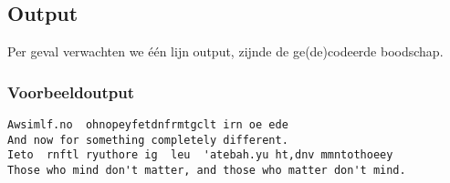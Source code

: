 \subsection*{Output}

Per geval verwachten we \'e\'en lijn output, zijnde de ge(de)codeerde boodschap.

\subsubsection*{Voorbeeldoutput}

\begin{verbatim}
Awsimlf.no  ohnopeyfetdnfrmtgclt irn oe ede
And now for something completely different.
Ieto  rnftl ryuthore ig  leu  'atebah.yu ht,dnv mmntothoeey
Those who mind don't matter, and those who matter don't mind.
\end{verbatim}
